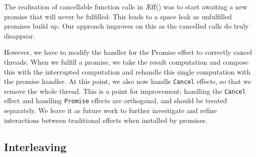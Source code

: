 \documentclass[msc,deptreport,cs]{infthesis} %
\newcommand{\code}[1]{\lstinline{#1}}
\newcommand{\texthighlight}[1]{%
  \colorbox{red!20}{#1}}
\newcommand{\greytext}[1]{\textcolor{black!40}{#1}}
\newcommand\aeff{{\AE}ff\xspace}
\begin{document}

The realisation of cancellable function calls in
\aeff(\cite{ahman2020asynchronous}) was to start awaiting a new promise that
will never be fulfilled. This leads to a space leak as unfulfilled promises
build up. Our approach improves on this as the cancelled calls do truly
disappear.


However, we have to modify the handler for the \textsf{Promise} effect to
correctly cancel threads. When we fulfill a promise, we take the result
computation and compose this with the interrupted computation and rehandle this
single computation with the promise handler. At this point, we also now handle
\code{Cancel} effects, so that we remove the whole thread. This is a point for
improvement; handling the \code{Cancel} effect and handling \code{Promise}
effects are orthogonal, and should be treated separately. We leave it as future
work to further investigate and refine interactions between traditional effects
when installed by promises.




\subsection{Interleaving}
\end{document}
